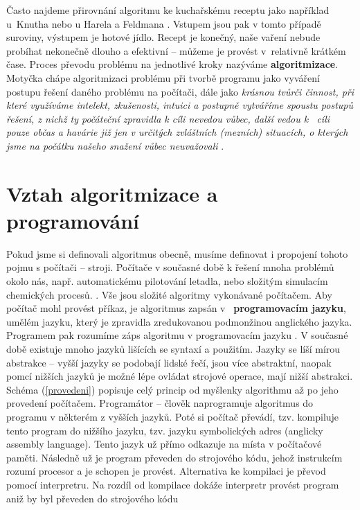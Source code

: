 \documentclass[FP,DP]{tulthesis}
\begin{document}
Často najdeme přirovnání algoritmu ke kuchařskému receptu jako například u~Knutha \citeyearpar[s.~6]{knuth} nebo u Harela a Feldmana  \citeyearpar[s.~4]{spirit}. Vstupem jsou pak v tomto případě suroviny, výstupem je hotové jídlo. Recept je konečný, naše vaření nebude probíhat nekonečně dlouho a efektivní -- můžeme je provést v~relativně krátkém čase. Proces převodu problému na jednotlivé kroky nazýváme \textbf{algoritmizace}.\citep*[s.~67]{didaktikderinformatik} Motyčka  chápe algoritmizaci problému při tvorbě programu jako  vyváření postupu řešení daného problému na počítači, dále jako \textit {krásnou tvůrči činnost, při které využíváme intelekt, zkušenosti, intuici a postupně vytváříme spoustu postupů řešení, z nichž ty počáteční zpravidla k cíli nevedou vůbec, další vedou k ~cíli pouze občas a havárie již jen v určitých zvláštních (mezních) situacích, o kterých jsme na počátku našeho snažení vůbec neuvažovali} \citeyearpar[s.~5]{motycka}.

\section{Vztah algoritmizace a programování}
Pokud jsme si definovali algoritmus obecně, musíme definovat i propojení tohoto pojmu s počítači -- stroji. Počítače v současné době k řešení mnoha problémů okolo nás, např. automatickému pilotování letadla, nebo složitým simulacím chemických procesů.  \citep[s.~49]{spirit}. Vše jsou složité algoritmy vykonávané počítačem. Aby počítač mohl provést příkaz, je algoritmus zapsán v~\textbf{ programovacím jazyku}, umělém jazyku, který je zpravidla zredukovanou podmonžinou anglického jazyka. Programem pak rozumíme záps algoritmu v programovacím jazyku \citep[s.~6]{motycka}. V současné době existuje mnoho jazyků lišících se syntaxí a použitím. Jazyky se líší mírou abstrakce -- vyšší jazyky se podobají lidské řečí, jsou více abstraktní, naopak pomcí nižších jazyků je možné lépe ovládat strojové operace, mají nižší abstrakci.  Schéma (\ref{provedeni}) popisuje celý princip od myšlenky algorithmu až po jeho provedení počítačem. Programátor -- člověk naprogramuje algoritmus do programu  v některém z vyšších jazyků. Poté si počítač převádí, tzv. kompiluje tento program do nižšího jazyku, tzv. jazyku symbolických adres (anglicky assembly language). Tento jazyk už přímo odkazuje na místa v počítačové paměti. Následně už je program převeden do strojového kódu, jehož instrukcím rozumí procesor a je schopen je provést. Alternativa ke kompilaci je převod pomocí interpretru. Na rozdíl od kompilace dokáže interpretr provést program aniž by byl převeden do strojového kódu \citep[s.~54-57]{spirit}
\end{document}
